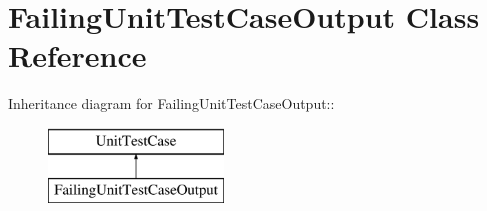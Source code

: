 \hypertarget{class_failing_unit_test_case_output}{
\section{FailingUnitTestCaseOutput Class Reference}
\label{class_failing_unit_test_case_output}
}
Inheritance diagram for FailingUnitTestCaseOutput::\begin{figure}[H]
\begin{center}
\leavevmode
\includegraphics[height=2cm]{class_failing_unit_test_case_output}
\end{center}
\end{figure}
